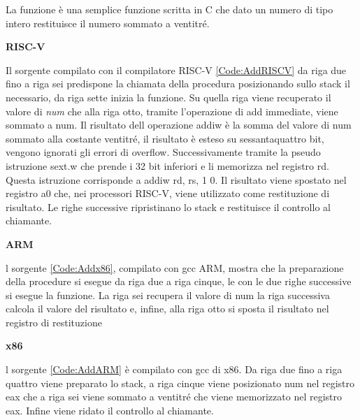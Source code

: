 \documentclass[12pt, a4paper]{report}
\begin{document}


La funzione è una semplice funzione scritta in C che dato un numero di tipo intero restituisce il numero sommato a ventitré. 

\vspace{0.3 cm}
\textbf{RISC-V}

\vspace{0.3 cm}
Il sorgente compilato con il compilatore RISC-V \ref{Code:AddRISCV} da riga due fino a riga sei predispone la chiamata della procedura posizionando sullo stack il necessario, da riga sette inizia la funzione. Su quella riga viene recuperato il valore di \textit{num} che alla riga otto, tramite l'operazione di add immediate, viene sommato a num. Il risultato dell operazione addiw è la somma del valore di num sommato alla costante ventitré, il risultato è esteso su sessantaquattro bit, vengono ignorati gli errori di overflow. Successivamente tramite la pseudo istruzione sext.w che prende i 32 bit inferiori e li memorizza nel registro rd. Questa istruzione corrisponde a addiw rd, rs, 1 0. Il risultato viene spostato nel registro a0 che, nei processori RISC-V, viene utilizzato come restituzione di risultato. Le righe successive ripristinano lo stack e restituisce il controllo al chiamante.

\vspace{0.3 cm}
\textbf{ARM}

\vspace{0.3 cm}

l sorgente \ref{Code:Addx86}, compilato con gcc ARM, mostra che la preparazione della procedure si esegue da riga due a riga cinque, le con le due righe successive si esegue la funzione. La riga sei recupera il valore di num la riga successiva calcola il valore del risultato e, infine, alla riga otto si sposta il risultato nel registro di restituzione


\vspace{0.3 cm}
\textbf{x86}

l sorgente \ref{Code:AddARM} è compilato con gcc di x86. Da riga due fino a riga quattro viene preparato lo stack, a riga cinque viene posizionato num nel registro eax che a riga sei viene sommato a ventitré che viene memorizzato nel registro eax. Infine viene ridato il controllo al chiamante.

\vspace{0.3 cm}
\end{document}
